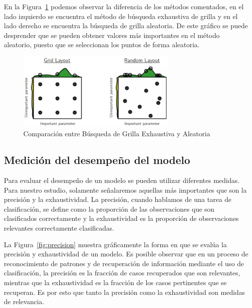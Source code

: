 En la Figura~\ref{fig:gridsearch} podemos observar la diferencia de los métodos comentados, en el lado izquierdo se encuentra el método de búsqueda exhaustiva de grilla y en el lado derecho se encuentra la búsqueda de grilla aleatoria. De este gráfico se puede desprender que se pueden obtener valores más importantes en el método aleatorio, puesto que se seleccionan los puntos de forma aleatoria.
       \begin{figure}[]
        \centering
        \includegraphics[width=0.7\textwidth]{Figuras/gridsearchbad.jpg}
         \caption{Comparación entre Búsqueda de Grilla Exhaustiva y Aleatoria\cite{cs231n}}
         \label{fig:gridsearch}
      \end{figure}
\subsection{Medición del desempeño del modelo}

Para evaluar el desempeño de un modelo se pueden utilizar diferentes medidas. Para nuestro estudio, solamente señalaremos aquellas más importantes que son la precisión y la exhaustividad. La precisión, cuando hablamos de una tarea de clasificación, se define como la proporción de las observaciones que son clasificados correctamente y la exhaustividad es la proporción de observaciones relevantes correctamente clasificadas.

La Figura~\ref{fig:precision} muestra gráficamente la forma en que se evalúa la precisión y exhaustividad de un modelo. Es posible observar que en un proceso de reconocimiento de patrones y de recuperación de información mediante el uso de  clasificación, la precisión es la fracción de casos recuperados que son relevantes, mientras que la exhaustividad es la fracción de los casos pertinentes que se recuperan. Es por esto que tanto la precisión como la exhaustividad son medidas de relevancia.\cite{Fawcett2006861}

